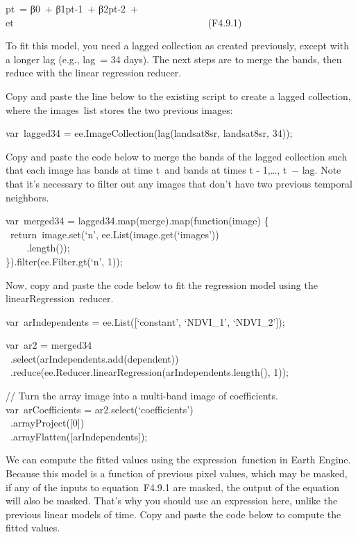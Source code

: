 \documentclass[
  letterpaper,
  DIV=11,
  numbers=noendperiod]{scrreprt}
\begin{document}
pt~= β0~+ β1pt-1~+ β2pt-2~+
et~~~~~~~~~~~~~~~~~~~~~~~~~~~~~~~~~~~~~~~~(F4.9.1)

To fit this model, you need a lagged collection as created previously,
except with a longer lag (e.g., lag~= 34 days). The next steps are to
merge the bands, then reduce with the linear regression reducer.

Copy and paste the line below to the existing script to create a lagged
collection, where the images~list stores the two previous images:

var~lagged34 = ee.ImageCollection(lag(landsat8sr, landsat8sr, 34));

Copy and paste the code below to merge the bands of the lagged
collection such that each image has bands at time t~and bands at times t
- 1,\ldots, t~− lag. Note that it's necessary to filter out any images
that don't have two previous temporal neighbors.

var~merged34 = lagged34.map(merge).map(function(image) \{~
~return~image.set(`n', ee.List(image.get(`images'))\\
\hspace*{0.333em} ~ ~ ~.length());\\
\}).filter(ee.Filter.gt(`n', 1));

Now, copy and paste the code below to fit the regression model using the
linearRegression~reducer.

var~arIndependents = ee.List({[}`constant', `NDVI\_1', `NDVI\_2'{]});

var~ar2 = merged34\\
\hspace*{0.333em} ~.select(arIndependents.add(dependent))\\
\hspace*{0.333em}
~.reduce(ee.Reducer.linearRegression(arIndependents.length(), 1));

// Turn the array image into a multi-band image of coefficients.\\
var~arCoefficients = ar2.select(`coefficients')\\
\hspace*{0.333em} ~.arrayProject({[}0{]})\\
\hspace*{0.333em} ~.arrayFlatten({[}arIndependents{]});

We can compute the fitted values using the expression~function in Earth
Engine. Because this model is a function of previous pixel values, which
may be masked, if any of the inputs to equation~F4.9.1 are masked, the
output of the equation will also be masked. That's why you should use an
expression here, unlike the previous linear models of time. Copy and
paste the code below to compute the fitted values.
\end{document}
